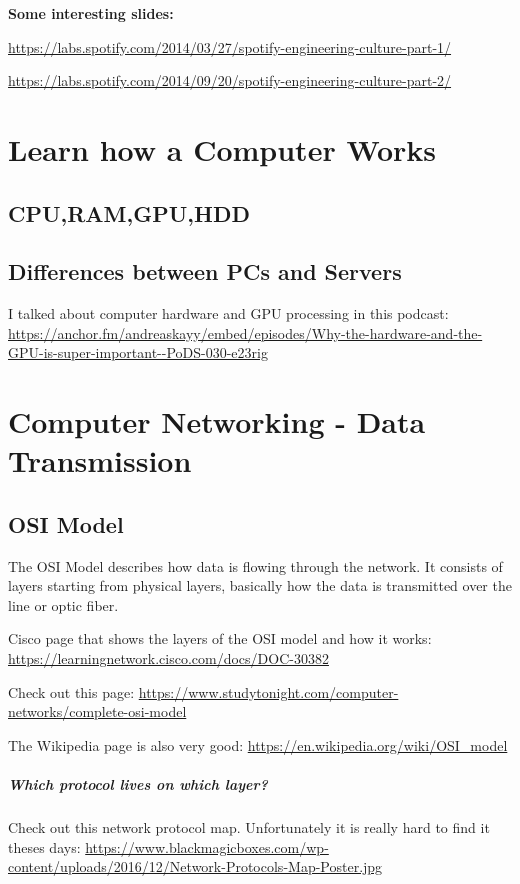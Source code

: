 \documentclass[12pt, numbers=noenddot]{scrreprt} %
\begin{document}
\textbf{Some interesting slides:}

\url{https://labs.spotify.com/2014/03/27/spotify-engineering-culture-part-1/}

\url{https://labs.spotify.com/2014/09/20/spotify-engineering-culture-part-2/}


 \chapter{Learn how a Computer Works}

\section{CPU,RAM,GPU,HDD}

\section{Differences between PCs and Servers}

I talked about computer hardware and GPU processing in this podcast: \url{https://anchor.fm/andreaskayy/embed/episodes/Why-the-hardware-and-the-GPU-is-super-important--PoDS-030-e23rig}

\chapter{Computer Networking - Data Transmission}

\section{OSI Model}

The OSI Model describes how data is flowing through the network. It consists of layers starting from physical layers, basically how the data is transmitted over the line or optic fiber.

Cisco page that shows the layers of the OSI model and how it works: \url{https://learningnetwork.cisco.com/docs/DOC-30382}

Check out this page: \url{https://www.studytonight.com/computer-networks/complete-osi-model}

The Wikipedia page is also very good: \url{https://en.wikipedia.org/wiki/OSI_model}

\paragraph{Which protocol lives on which layer?} Check out this network protocol map. Unfortunately it is really hard to find it theses days:
\url{https://www.blackmagicboxes.com/wp-content/uploads/2016/12/Network-Protocols-Map-Poster.jpg}
\end{document}
